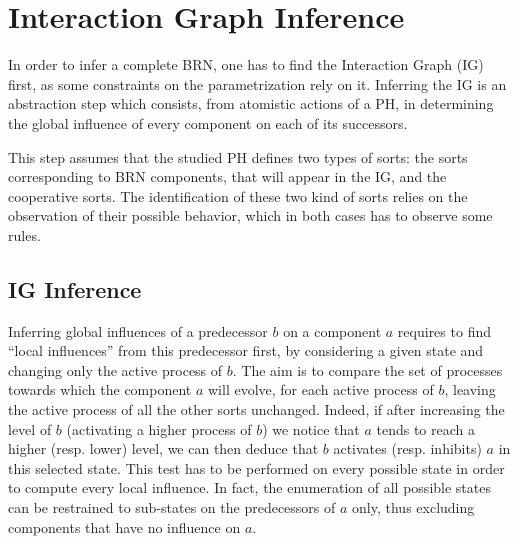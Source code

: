 \section{Interaction Graph Inference}\label{sec:infer-IG}

In order to infer a complete BRN, one has to find the Interaction Graph (IG) first, as some constraints on the parametrization rely on it.
Inferring the IG is an abstraction step which consists, from atomistic actions of a PH, in determining the global influence of every component on each of its successors.

This step assumes that the studied PH defines two types of sorts: the sorts corresponding to BRN components, that will appear in the IG, and the cooperative sorts.
The identification of these two kind of sorts relies on the observation of their possible behavior, which in both cases has to observe some rules.



\subsection*{IG Inference}\label{ssec:infer-IG}


Inferring global influences of a predecessor $b$ on a component $a$ requires to find “local influences” from this predecessor first, by considering a given state and changing only the active process of $b$.
The aim is to compare the set of processes towards which the component $a$ will evolve, for each active process of $b$, leaving the active process of all the other sorts unchanged.
Indeed, if after increasing the level of $b$ (\ie activating a higher process of $b$) we notice that $a$ tends to reach a higher (resp. lower) level, we can then deduce that $b$ activates (resp. inhibits) $a$ in this selected state.
This test has to be performed on every possible state in order to compute every local influence.
In fact, the enumeration of all possible states can be restrained to sub-states on the predecessors of $a$ only, thus excluding components that have no influence on $a$.


